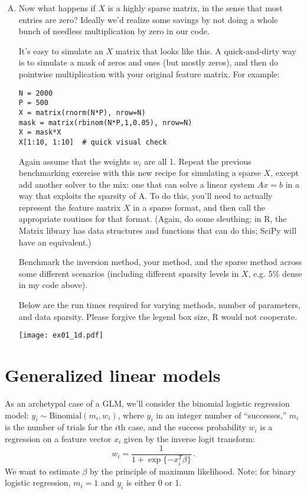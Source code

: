 \documentclass{article}
\begin{document}
\begin{enumerate}[(A)]
\item Now what happens if $X$ is a highly sparse matrix, in the sense that most entries are zero?  Ideally we'd realize some savings by not doing a whole bunch of needless multiplication by zero in our code.

It's easy to simulate an $X$ matrix that looks like this.  A quick-and-dirty way is to simulate a mask of zeros and ones (but mostly zeros), and then do pointwise multiplication with your original feature matrix.  For example:
\begin{verbatim}
N = 2000
P = 500
X = matrix(rnorm(N*P), nrow=N)
mask = matrix(rbinom(N*P,1,0.05), nrow=N)
X = mask*X
X[1:10, 1:10]  # quick visual check
\end{verbatim}

Again assume that the weights $w_i$ are all 1.  Repeat the previous benchmarking exercise with this new recipe for simulating a sparse $X$, except add another solver to the mix: one that can solve a linear system $Ax = b$ in a way that exploits the sparsity of A.  To do this, you'll need to actually represent the feature matrix $X$ in a sparse format, and then call the appropriate routines  for that format.  (Again, do some sleuthing; in R, the Matrix library has data structures and functions that can do this; SciPy will have an equivalent.)

Benchmark the inversion method, your method, and the sparse method across some different scenarios (including different sparsity levels in $X$, e.g. 5\% dense in my code above).

\color{blue}
Below are the run times required for varying methods, number of parameters, and data sparsity. Please forgive the legend box size, R would not cooperate. 
\color{black}

\begin{center}
\texttt{[image: ex01\_1d.pdf]}
\end{center}


\end{enumerate}



\section{Generalized linear models}

As an archetypal case of a GLM, we'll consider the binomial logistic regression model: $y_i \sim \mbox{Binomial}(m_i, w_i)$, where $y_i$ in an integer number of ``successes,'' $m_i$ is the number of trials for the $i$th case, and the success probability $w_i$ is a regression on a feature vector $x_i$ given by the inverse logit transform:
$$
w_i = \frac{1}{1 + \exp\{-x_i^T \beta\}} \, .
$$
We want to estimate $\beta$ by the principle of maximum likelihood.  Note: for binary logistic regression, $m_i = 1$ and $y_i$ is either 0 or 1.
\end{document}
